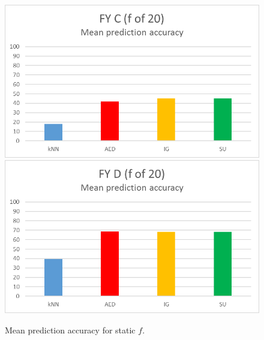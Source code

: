 \begin{figure}[hp]
\includegraphics[scale=0.17]{Graphs/FY_C/bar20}
\includegraphics[scale=0.17]{Graphs/FY_D/bar20}
 
\caption{Mean prediction accuracy for static $f$.}
\label{fig:bar}
\end{figure}

